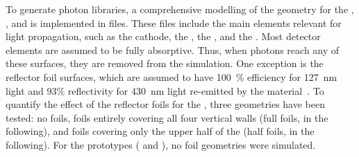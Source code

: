 To generate photon libraries, a comprehensive modelling of the geometry for the , , and  is implemented in  files. These files include the main elements relevant for light propagation, such as the cathode, the , the , and the . Most detector elements are assumed to be fully absorptive. 
Thus, when photons reach any of these surfaces, they are removed from the simulation. One exception is the  reflector foil surfaces, which are assumed to have \SI{100}{\%}  efficiency for \SI{127}{\nm}  light and 93\% reflectivity for \SI{430}{\nm} light re-emitted by the  material~\cite{Francini:2013lua}. 
To quantify the effect of the  reflector foils for the , three geometries have been tested: no foils, foils entirely covering all four  vertical walls (full foils, in the following), and foils covering only the upper half of the  (half foils, in the following). For the  prototypes ( and ), no foil geometries were simulated.

